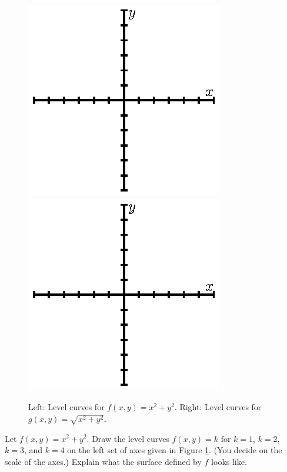 
\begin{activity} \label{A:9.1.9}
\begin{figure}[ht]
\begin{center}
  \includegraphics{figures/fig_9_1_activity_empty_1.eps}
  \hspace*{0.5in}
  \includegraphics{figures/fig_9_1_activity_empty_2.eps}
\caption{Left: Level curves for $f(x,y) = x^2+y^2$. Right: Level curves for $g(x,y) = \sqrt{x^2+y^2}$.}
\label{F:9.1.contour_activity}
\end{center}
\end{figure}
   \ba
    \item Let $f(x,y) = x^2+y^2$. Draw the level curves $f(x,y) = k$ for $k=1$, $k=2$, $k=3$, and $k=4$ on the left set of axes given in Figure \ref{F:9.1.contour_activity}. (You decide on the scale of the axes.) Explain what the surface defined by $f$ looks like.


\end{activity}
